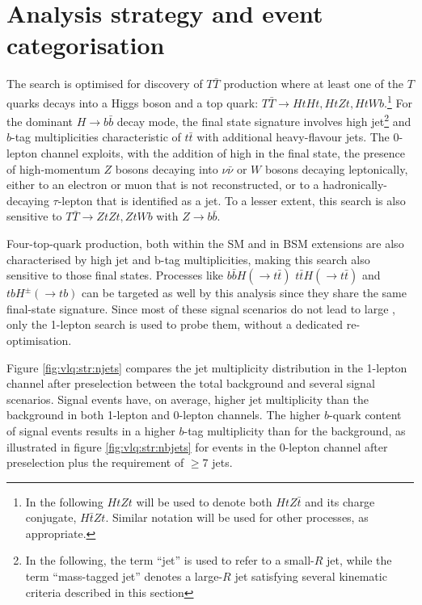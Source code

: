 \section{Analysis strategy and event categorisation}
\label{sec:vlq:anastr}
The search is optimised for discovery of $T\bar{T}$ production where at least one of the $T$ quarks decays into a Higgs boson and a top quark: $T\bar{T}\to HtHt,HtZt,HtWb$.\footnote{In the following $HtZt$ will be used to denote both $HtZ\bar{t}$ and its charge conjugate, $H\bar{t}Zt$. Similar notation will be used for other processes, as appropriate.} For the dominant $H\to b\bar{b}$ decay mode, the final state signature involves high jet\footnote{In the following, the term ``jet'' is used to refer to a small-$R$ jet, while the term ``mass-tagged jet'' denotes a large-$R$ jet satisfying several kinematic criteria described in this section} and $b$-tag multiplicities characteristic of $t\bar{t}$ with additional heavy-flavour jets.  The 0-lepton channel exploits, with the addition of high \MET in the final state, the presence of high-momentum $Z$ bosons decaying into $\nu\bar{\nu}$ or $W$ bosons decaying leptonically, either to an electron or muon that is not reconstructed, or to a hadronically-decaying $\tau$-lepton that is identified as a jet. To a lesser extent, this search is also sensitive to $T\bar{T}\to ZtZt,ZtWb$ with $Z \to b\bar{b}$.\par
Four-top-quark production, both within the SM and in BSM extensions are also characterised by high jet and b-tag multiplicities, making this search also sensitive to those final states. Processes like $b\bar{b}H(\to t\bar{t})$ $t\bar{t}H(\to t\bar{t})$ and $tbH^{\pm}(\to tb)$ can be targeted as well by this analysis since they share the same final-state signature. Since most of these signal scenarios do not lead to large \MET, only the 1-lepton search is used to probe them, without a dedicated re-optimisation.\par
Figure \ref{fig:vlq:str:njets} compares the jet multiplicity distribution in the 1-lepton channel after preselection between the total background and several signal scenarios. Signal events have, on average, higher jet multiplicity than the background in both 1-lepton and 0-lepton channels. The higher $b$-quark content of signal events results in a higher $b$-tag multiplicity than for the background, as illustrated in figure \ref{fig:vlq:str:nbjets} for events in the 0-lepton channel after preselection plus the requirement of $\ge$7 jets.
